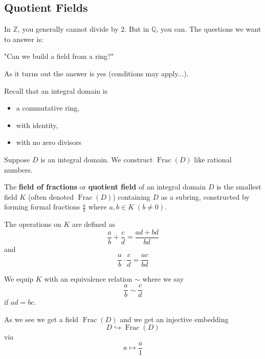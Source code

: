\subsection{Quotient Fields}
In $\mathbb Z$, you generally cannot divide by $2$. 
But in $\mathbb Q$, you can. 
The questions we want to answer is: 

"Can we build a field from a ring?"

As it turns out the answer is yes (conditions may apply...).

\newpage 
Recall that an integral domain is 
\begin{itemize}
    \item a commutative ring, 
    \item with identity, 
    \item with no zero divisors
\end{itemize}
Suppose $D$ is an integral domain. We construct 
$\operatorname{Frac}(D)$ like rational numbers.  
 
\begin{defn}
    The \textbf{field of fractions} or \textbf{quotient field}
    of an integral domain $D$ is the smallest field $K$ 
    (often denoted $\operatorname{Frac}(D)$)
    containing $D$ as a subring, constructed by forming formal 
    fractions $\frac{a}{b}$ where $a,b \in K \; (b \neq 0)$. 
    
    The operations on $K$ are defined as 
    \[
        \frac{a}{b} + \frac{c}{d} = \frac{ad + bd}{bd}
    \]
    and 
    \[
        \frac{a}{b}\cdot\frac{c}{d} = \frac{ac}{bd}
    \]

    We equip $K$ with an equivalence relation $\sim$ where we 
    say 
    \[
        \frac{a}{b} \sim \frac{c}{d}
    \]
    if $ad=bc$.
\end{defn}
As we see we get a field $\operatorname{Frac}(D)$ and 
we get an injective embedding
\[
    D \hookrightarrow{} \operatorname{Frac}(D)
\]
via 
\[
    a \mapsto \frac{a}{1}
\]


